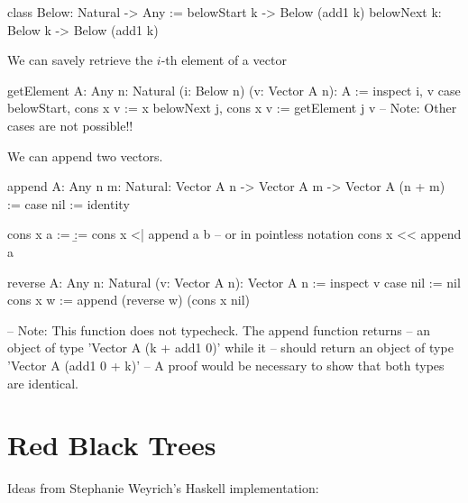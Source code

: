 \begin{alba}
    class
        Below: Natural -> Any
    :=
        belowStart {k} -> Below (add1 k)
        belowNext {k}: Below k -> Below (add1 k)
\end{alba}


We can savely retrieve the $i$-th element of a vector

\begin{alba}
    getElement {A: Any} {n: Natural} (i: Below n) (v: Vector A n): A :=
        inspect
            i, v
        case
            belowStart, cons x v :=
                x
            belowNext j, cons x v :=
                getElement j v
        -- Note: Other cases are not possible!!
\end{alba}

We can append two vectors.

\begin{alba}
    append
        {A: Any} {n m: Natural}:
        Vector A n -> Vector A m -> Vector A (n + m)
    :=
        case
            nil :=
                identity

            cons x a :=
                \b :=
                    cons x <| append a b
                -- or in pointless notation
                cons x << append a
\end{alba}


\begin{alba}
    reverse {A: Any} {n: Natural} (v: Vector A n): Vector A n
    :=
        inspect v case
            nil := nil
            cons x w := append (reverse w) (cons x nil)

    -- Note: This function does not typecheck. The append function returns
    --       an object of type 'Vector A (k + add1 0)' while it
    --       should return an object of type 'Vector A (add1 0 + k)'
    -- A proof would be necessary to show that both types are identical.
\end{alba}







\section{Red Black Trees}

Ideas from Stephanie Weyrich's Haskell implementation:

